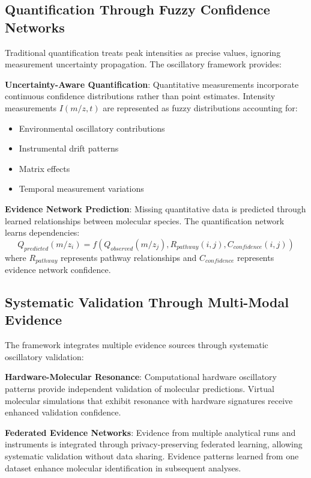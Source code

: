 \documentclass[11pt,a4paper]{article}
\begin{document}
\subsection{Quantification Through Fuzzy Confidence Networks}

Traditional quantification treats peak intensities as precise values, ignoring measurement uncertainty propagation. The oscillatory framework provides:

\textbf{Uncertainty-Aware Quantification}: Quantitative measurements incorporate continuous confidence distributions rather than point estimates. Intensity measurements $I(m/z,t)$ are represented as fuzzy distributions accounting for:
\begin{itemize}
\item Environmental oscillatory contributions
\item Instrumental drift patterns
\item Matrix effects
\item Temporal measurement variations
\end{itemize}

\textbf{Evidence Network Prediction}: Missing quantitative data is predicted through learned relationships between molecular species. The quantification network learns dependencies:
\begin{equation}
Q_{predicted}(m/z_i) = f(Q_{observed}(m/z_j), R_{pathway}(i,j), C_{confidence}(i,j))
\end{equation}
where $R_{pathway}$ represents pathway relationships and $C_{confidence}$ represents evidence network confidence.

\subsection{Systematic Validation Through Multi-Modal Evidence}

The framework integrates multiple evidence sources through systematic oscillatory validation:

\textbf{Hardware-Molecular Resonance}: Computational hardware oscillatory patterns provide independent validation of molecular predictions. Virtual molecular simulations that exhibit resonance with hardware signatures receive enhanced validation confidence.

\textbf{Federated Evidence Networks}: Evidence from multiple analytical runs and instruments is integrated through privacy-preserving federated learning, allowing systematic validation without data sharing. Evidence patterns learned from one dataset enhance molecular identification in subsequent analyses.
\end{document}
